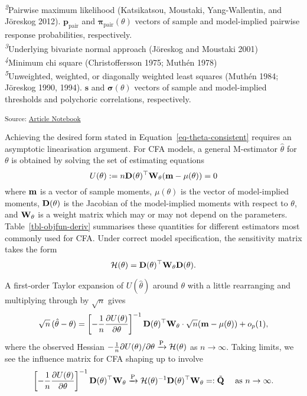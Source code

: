 \documentclass[
  letterpaper,
  DIV=11,
  numbers=noendperiod]{scrartcl}
\begin{document}
\begin{table}
{\begin{minipage}{\linewidth}
\textsuperscript{\textit{2}}Pairwise maximum likelihood (Katsikatsou, Moustaki, Yang-Wallentin, and Jöreskog 2012). \(\mathbf p_{\text{pair}}\) and \(\boldsymbol\pi_{\text{pair}}(\theta)\) vectors of sample and model-implied pairwise response probabilities, respectively.\\
\textsuperscript{\textit{3}}Underlying bivariate normal approach (Jöreskog and Moustaki 2001)\\
\textsuperscript{\textit{4}}Minimum chi square (Christoffersson 1975; Muthén 1978)\\
\textsuperscript{\textit{5}}Unweighted, weighted, or diagonally weighted least squares (Muthén 1984; Jöreskog 1990, 1994). \(\mathbf s\) and \(\boldsymbol\sigma(\theta)\) vectors of sample and model-implied thresholds and polychoric correlations, respectively.\\
\end{minipage}

}

\end{table}%

\textsubscript{Source:
\href{https://haziqj.github.io/ligof-tests/manuscript.qmd.html}{Article
Notebook}}

Achieving the desired form stated in Equation~\ref{eq-theta-consistent}
requires an asymptotic linearisation argument. For CFA models, a general
M-estimator \(\hat\theta\) for \(\theta\) is obtained by solving the set
of estimating equations \[
U(\theta) := n {\mathbf D}(\theta)^\top {\mathbf W}_{\theta} ({\mathbf m} - \mu(\theta)) = 0
\] where \({\mathbf m}\) is a vector of sample moments, \(\mu(\theta)\) is the
vector of model-implied moments, \({\mathbf D}(\theta)\) is the Jacobian of the
model-implied moments with respect to \(\theta\), and \({\mathbf W}_{\theta}\)
is a weight matrix which may or may not depend on the parameters.
Table~\ref{tbl-objfun-deriv} summarises these quantities for different
estimators most commonly used for CFA. Under correct model
specification, the sensitivity matrix takes the form \[
{\mathcal H}(\theta) = {\mathbf D}(\theta)^{\top} {\mathbf W}_{\theta}  {\mathbf D}(\theta).
\]

A first-order Taylor expansion of \(U(\hat\theta)\) around \(\theta\)
with a little rearranging and multiplying through by \(\sqrt n\) gives
\[
\sqrt{n}\,(\hat\theta - \theta)
=
\left[ - \frac{1}{n} \frac{\partial U(\theta)}{\partial\theta} \right]^{-1}
{\mathbf D}(\theta)^\top {\mathbf W}_{\theta} \cdot \sqrt n ({\mathbf m} - \mu(\theta))
+ o_p(1),
\] where the observed Hessian
\(-\frac{1}{n}\partial U(\theta) / \partial\theta \xrightarrow{\text P} {\mathcal H}(\theta)\)
as \(n \to \infty\). Taking limits, we see the influence matrix for CFA
shaping up to involve \[
\left[ - \frac{1}{n} \frac{\partial U(\theta)}{\partial\theta} \right]^{-1}
{\mathbf D}(\theta)^\top {\mathbf W}_{\theta} \xrightarrow{\text P} {\mathcal H}(\theta)^{-1} {\mathbf D}(\theta)^\top {\mathbf W}_{\theta} =: \tilde {{\mathbf Q}} \quad \text{ as } n\to\infty.
\]
\end{document}
